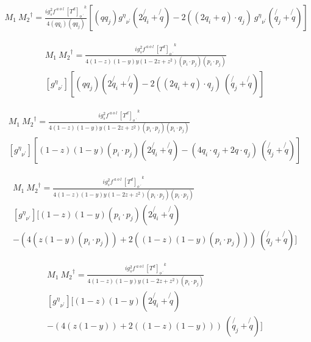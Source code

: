 \begin{equation}
\begin{split}
M_1\:{M_2}^{\dagger}=\frac{ig_s ^2 f^{\:a\:o\:l}\: {[T^d]_{o\:^{\prime}}}^k}{4(qq_i)(qq_j)}
[(qq_j){g^{{\eta}}}_{{\nu}^{\prime}}(2\not{q_i} +\not{q})-2((2q_i +q)\cdot{q_j})\:{g^{{\eta}}}_{{\nu}^{\prime}}(\not{q_j} + \not{q})]
\end{split}
\end{equation}

\begin{equation}
\begin{split}
M_1\:{M_2}^{\dagger}=\frac{ig_s ^2 f^{\:a\:o\:l}\: {[T^d]_{o\:^{\prime}}}^k}{4(1-z)(1-y)y(1-2z+z^2)(p_i \cdot p_j)(p_i \cdot p_j)}\\
[{g^{{\eta}}}_{{\nu}^{\prime}}][(qq_j)(2\not{q_i} +\not{q})-2((2q_i +q)\cdot{q_j})\:(\not{q_j} + \not{q})]
\end{split}
\end{equation}

\begin{equation}
\begin{split}
M_1\:{M_2}^{\dagger}=\frac{ig_s ^2 f^{\:a\:o\:l}\: {[T^d]_{o\:^{\prime}}}^k}{4(1-z)(1-y)y(1-2z+z^2)(p_i \cdot p_j)(p_i \cdot p_j)}\\
[{g^{{\eta}}}_{{\nu}^{\prime}}][(1-z)(1-y) (p_i \cdot p_j)(2\not{q_i} +\not{q})-(4q_i\cdot q_j +2q\cdot q_j)\:(\not{q_j} + \not{q})]
\end{split}
\end{equation}

\begin{equation}
\begin{split}
M_1\:{M_2}^{\dagger}=\frac{ig_s ^2 f^{\:a\:o\:l}\: {[T^d]_{o\:^{\prime}}}^k}{4(1-z)(1-y)y(1-2z+z^2)(p_i \cdot p_j)(p_i \cdot p_j)}\\
[{g^{{\eta}}}_{{\nu}^{\prime}}][(1-z)(1-y) (p_i \cdot p_j)(2\not{q_i}+\not{q})\\
-(4(z(1-y) (p_i \cdot p_j)) +2((1-z)(1-y) (p_i \cdot p_j)))\:(\not{q_j} + \not{q})]
\end{split}
\end{equation}

\begin{equation}
\begin{split}
M_1\:{M_2}^{\dagger}=\frac{ig_s ^2 f^{\:a\:o\:l}\: {[T^d]_{o\:^{\prime}}}^k}{4(1-z)(1-y)y(1-2z+z^2)(p_i \cdot p_j)}\\
[{g^{{\eta}}}_{{\nu}^{\prime}}][(1-z)(1-y) (2\not{q_i}+\not{q})\\
-(4(z(1-y)) +2((1-z)(1-y) ))\:(\not{q_j} + \not{q})]
\end{split}
\end{equation}

